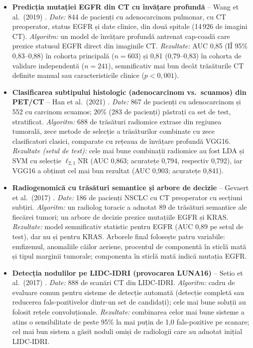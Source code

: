 \documentclass[11pt, a4paper]{article}
\begin{document}
\begin{itemize}
    \item \textbf{Predicția mutației EGFR din CT cu învățare profundă} -- Wang et al.\ (2019) \cite{wang2019}.
    \textit{Date:} 844 de pacienți cu adenocarcinom pulmonar, cu CT preoperator, status EGFR și date clinice, din două spitale (14\,926 de imagini CT).
    \textit{Algoritm:} un model de învățare profundă antrenat cap-coadă care prezice statusul EGFR direct din imaginile CT.
    \textit{Rezultate:} AUC 0,85 (IÎ 95\% 0,83--0,88) în cohorta principală ($n = 603$) și 0,81 (0,79--0,83) în cohorta de validare independentă ($n = 241$), semnificativ mai bun decât trăsăturile CT definite manual sau caracteristicile clinice ($p < 0{,}001$).

    \item \textbf{Clasificarea subtipului histologic (adenocarcinom vs.\ scuamos) din PET/CT} -- Han et al.\ (2021) \cite{han2021}.
    \textit{Date:} 867 de pacienți cu adenocarcinom și 552 cu carcinom scuamos; 20\% (283 de pacienți) păstrați ca set de test, stratificat.
    \textit{Algoritm:} 688 de trăsături radiomice extrase din regiunea tumorală, zece metode de selecție a trăsăturilor combinate cu zece clasificatori clasici, comparate cu rețeaua de învățare profundă VGG16.
    \textit{Rezultate (setul de test):} cele mai bune combinații radiomice au fost LDA și SVM cu selecție $\ell_{2,1}$NR (AUC 0,863; acuratețe 0,794, respectiv 0,792), iar VGG16 a obținut cel mai bun rezultat (AUC 0,903; acuratețe 0,841).

    \item \textbf{Radiogenomică cu trăsături semantice și arbore de decizie} -- Gevaert et al.\ (2017) \cite{gevaert2017}.
    \textit{Date:} 186 de pacienți NSCLC cu CT preoperator cu secțiuni subțiri.
    \textit{Algoritm:} un radiolog toracic a adnotat 89 de trăsături semantice ale fiecărei tumori; un arbore de decizie prezice mutațiile EGFR și KRAS.
    \textit{Rezultate:} model semnificativ statistic pentru EGFR (AUC 0,89 pe setul de test), dar nu și pentru KRAS. Arborele final folosește patru variabile: emfizemul, anomaliile căilor aeriene, procentul de componentă în sticlă mată și tipul marginii tumorale; componenta în sticlă mată indică mutația EGFR.

    \item \textbf{Detecția nodulilor pe LIDC-IDRI (provocarea LUNA16)} -- Setio et al.\ (2017) \cite{setio2017}.
    \textit{Date:} 888 de scanări CT din LIDC-IDRI.
    \textit{Algoritm:} cadru de evaluare comun pentru sisteme de detecție automată (detecție completă sau reducerea fals-pozitivelor dintr-un set de candidați); cele mai bune soluții au folosit rețele convoluționale.
    \textit{Rezultate:} combinarea celor mai bune sisteme a atins o sensibilitate de peste 95\% la mai puțin de 1,0 fals-pozitive pe scanare; cel mai bun sistem a găsit noduli omiși de radiologii care au adnotat inițial LIDC-IDRI.
\end{itemize}
\end{document}
